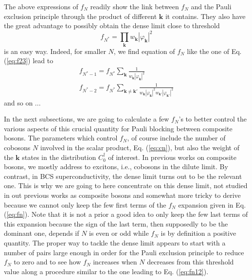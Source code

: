 \documentclass[aps,prb,preprint,groupedaddress,amsmath]{revtex4}
\newcommand{\vk}{\ensuremath{\mathbf{k}}}
\newcommand{\dg}{\ensuremath{\dagger}}
\begin{document}
 The above expressions of $f_N$ readily show the link between $f_N$ and the Pauli exclusion principle through the product of different  $\vk$ it contains. They also have the great advantage to possibly obtain the dense limit close to  threshold 
 \begin{equation}
 f_{N^*}=\prod_{\vk}w_{\vk}|\varphi_{\vk}|^2
 \end{equation}
 is an easy way. Indeed, for smaller $N$, we find equation of $f_N$ like the one of Eq. (\ref{eq:f23}) lead to 
 \begin{equation}\label{eq:fn12}
 \begin{split}
 f_{N^*-1}=f_{N^*}\sum_{\vk}\frac1{w_{\vk}|\varphi_{\vk}|^2}\\
 f_{N^*-2}=f_{N^*}\sum_{\vk\neq\vk'}\frac1{w_{\vk}|\varphi_{\vk}|^2w_{\vk'}|\varphi_{\vk'}|^2}
 \end{split}
 \end{equation}
 and so on ...  

In the next subsections, we are going to calculate a few $f_N$'s to better control the various aspects of this crucial quantity for Pauli blocking between composite bosons. The parameters which control $f_N$, of course include the number of cobosons $N$ involved in the scalar product, Eq. (\ref{eq:cn}), but also the weight of the $\vk$ states in the distribution $C^\dg_0$ of interest. In previous works on composite bosons, we mostly address to excitons, i.e., cobosons in the dilute limit. By contrast, in BCS superconductivity, the dense limit turns out to be the relevant one.  This is why we are going to here concentrate on this dense limit, not studied in out previous works as composite bosons and somewhat more tricky to derive because we cannot only keep the few first terms of the $f_N$ expansion given in Eq. (\ref{eq:fn}). Note that it is not a prior a good idea to only keep the few last terms of this expansion  because the sign of the last term, then supposedly to be the dominant one, depends if $N$ is even or odd while $f_N$ is by definition a positive quantity. The proper way to tackle the dense limit appears to start with a number of pairs large enough in order for the Pauli exclusion principle to  reduce $f_N$ to zero and to see how $f_N$ increases when $N$ decreases from this threshold value along a procedure similar to the one leading to Eq. (\ref{eq:fn12}).
\end{document}
